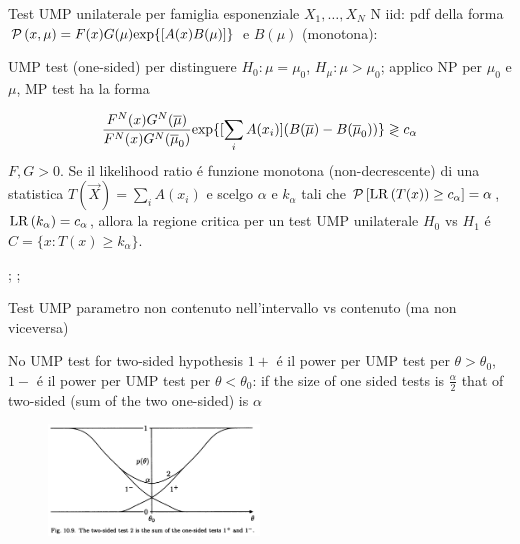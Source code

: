 \documentclass[asd-beamer.tex]{subfiles}
\begin{document}
\begin{frame}{Test UMP unilaterale per famiglia esponenziale}\frameintoc{}
$X_1,\ldots,X_N$ N iid: pdf della forma $\operatorname{\mathcal{P}}{(x,\mu)}=F(x)G(\mu)\text{exp}\{[A(x)B(\mu)]\}$ e $B(\mu)$ (monotona):

UMP test (one-sided) per distinguere $H_0: \mu=\mu_0$, $H_{\mu}: \mu>\mu_0$; applico NP per $\mu_0$ e $\mu$, MP test ha la forma

\[\frac{F^N(x)G^N(\overline{\mu})}{F^N(x)G^N(\overline{\mu}_0)}\text{exp}\{[\sum_iA(x_i)](B(\overline{\mu})-B(\overline{\mu}_0))\}\gtrless c_{\alpha}\]
$F,G>0$.
Se il likelihood ratio \'e funzione monotona (non-decrescente) di una statistica $T(\vec{X})=\sum_iA(x_i)$ e scelgo $\alpha$ e $k_{\alpha}$ tali che $\operatorname{\mathcal{P}}{[\operatorname{LR}{(T(x))}\geq c_{\alpha}]}=\alpha$, $\operatorname{LR}{(k_{\alpha})}=c_{\alpha}$,  allora la regione critica per un test UMP unilaterale $H_0$ vs $H_1$ \'e $C=\{x:T(x)\geq k_{\alpha}\}$.

\cite[5]{lrtmptumpt}; \cite[445]{inferencemukhopadhyay2000}; \cite[sec 3.6]{lehmann2006testing}
\end{frame}

\begin{frame}{Test UMP parametro non contenuto nell'intervallo vs contenuto (ma non viceversa)}

\cite[269]{james2006statistical}\cite[sec 3.7]{lehmann2006testing}
\end{frame}

\begin{wordonframe}{No UMP test for two-sided hypothesis}
$1+$ \'e il power per UMP test per $\theta>\theta_0$, $1-$ \'e il power per UMP test per $\theta<\theta_0$: if the size of one sided tests is $\frac{\alpha}{2}$ that of two-sided (sum of the two one-sided) is $\alpha$
\begin{figure}[!ht]
\includegraphics[trim={0cm 0cm 0 0},clip, keepaspectratio,width=0.5\textwidth]{figures/james/test/oneone2sided}
\label{fig:oneone2sided}
\end{figure}
\end{wordonframe}
\end{document}
